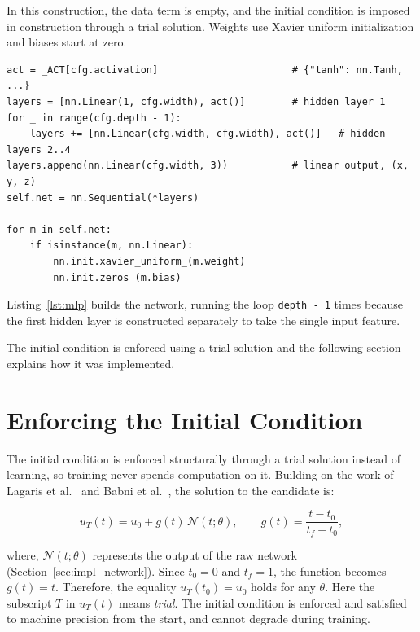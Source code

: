 In this construction, the data term is empty, and the initial condition is imposed in construction through a trial solution. Weights use Xavier uniform initialization and biases start at zero.

\begin{lstlisting}[caption={Network construction. Depth, width, and activation come from \texttt{Config}, so the architecture is data rather than code.}, label={lst:mlp}]
act = _ACT[cfg.activation]                       # {"tanh": nn.Tanh, ...}
layers = [nn.Linear(1, cfg.width), act()]        # hidden layer 1
for _ in range(cfg.depth - 1):
    layers += [nn.Linear(cfg.width, cfg.width), act()]   # hidden layers 2..4
layers.append(nn.Linear(cfg.width, 3))           # linear output, (x, y, z)
self.net = nn.Sequential(*layers)

for m in self.net:
    if isinstance(m, nn.Linear):
        nn.init.xavier_uniform_(m.weight)
        nn.init.zeros_(m.bias)
\end{lstlisting}

 Listing~\ref{lst:mlp} builds the network, running the loop \texttt{depth - 1} times because the first hidden layer is constructed separately to take the single input feature.

 The initial condition is enforced using a trial solution and the following section explains how it was implemented. 

\section{Enforcing the Initial Condition}
\label{sec:impl_ic}

The initial condition is enforced structurally through a trial solution instead of learning, so training never spends computation on it. Building on the work of Lagaris et al.\ \cite{lagaris1998ann} and Babni et al.\ \cite{babni2025error}, the solution to the candidate is:

\begin{equation}
u_T(t) = u_0 + g(t)\,\mathcal{N}(t;\theta), \qquad g(t) = \frac{t - t_0}{t_f - t_0},
\label{eq:trial}
\end{equation}

where, $\mathcal{N}(t;\theta)$ represents the output of the raw network (Section~\ref{sec:impl_network}). Since  $t_0=0$ and $t_f=1$, the function becomes $g(t)=t$. Therefore, the equality $u_T(t_0) = u_0$ holds for any $\theta$.
Here the subscript $T$ in $u_T(t)$ means \emph{trial}.
The initial condition is enforced and satisfied to machine precision from the start, and cannot degrade during training. 

